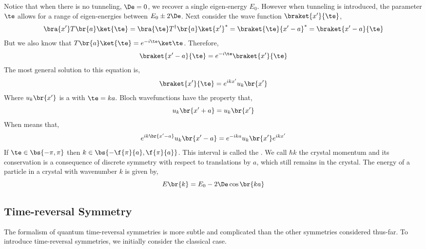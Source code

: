 \documentclass{article}
\begin{document}
\begin{center}
\end{center}
Notice that when there is no tunneling, $\De = 0$, we recover a single eigen-energy $E_0$. However when tunneling is introduced, the parameter $\te$ allows for a range of eigen-energies between $E_0 \pm 2 \De$. Next consider the wave function $\braket{x'}{\te}$,
\[ \bra{x'} T\br{a} \ket{\te} = \bra{\te} T^{\dagger}\br{a} \ket{x'}^* = \braket{\te}{x' - a}^* = \braket{x' - a}{\te} \]
But we also know that $T\br{a} \ket{\te} = e^{-i \te} \ket \te$. Therefore,
\[ \braket{x' - a}{\te} = e^{-i\te}\braket{x'}{\te} \]
The most general solution to this equation is,
\[ \braket{x'}{\te} = e^{i k x'} u_k \br{x'} \]
Where $u_k \br{x'}$ is a  with $\te = k a$. Bloch wavefunctions have the property that,
\[ u_k \br{x'+a} = u_k\br{x'} \]
When means that,
\[ e^{ik\br{x' -a}} u_k\br{x'-a} = e^{- i k a} u_k\br{x'} e^{i k x'} \]
If $\te \in \bs{-\pi, \pi}$ then $k \in \bs{-\f{\pi}{a}, \f{\pi}{a}}$. This interval is called the . We call $\hbar k$ the crystal momentum and its conservation is a consequence of discrete symmetry with respect to translations by $a$, which still remains in the crystal. The energy of a particle in a crystal with wavenumber $k$ is given by,
\[ E\br{k} = E_0 - 2 \De \cos \br{k a} \]
\subsection{Time-reversal Symmetry}
The formalism of quantum time-reversal symmetries is more subtle and complicated than the other symmetries considered thus-far. To introduce time-reversal symmetries, we initially consider the classical case.
\begin{center}
\end{center}
\end{document}
